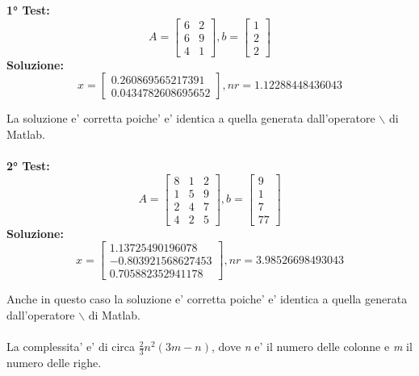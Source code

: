 \documentclass[10pt,a4paper]{article}
\begin{document}
\textbf{1° Test:}
\[
  A =
  \begin{bmatrix}
    6 & 2 \\
    6 & 9 \\
    4 & 1
  \end{bmatrix},
  b =
  \begin{bmatrix}
    1 \\ 2 \\ 2
  \end{bmatrix}
\]
\textbf{Soluzione:}
\[
  x =
  \begin{bmatrix}
    0.260869565217391 \\
    0.0434782608695652
  \end{bmatrix},
  \textit{nr} = 1.12288448436043
\]

La soluzione e' corretta poiche' e' identica a quella generata dall'operatore
$ \backslash $ di Matlab.
\\ \\
\textbf{2° Test:}
\[
  A =
  \begin{bmatrix}
    8 & 1 & 2 \\
    1 & 5 & 9 \\
    2 & 4 & 7 \\
    4 & 2 & 5
  \end{bmatrix},
  b =
  \begin{bmatrix}
    9 \\ 1 \\ 7 \\ 77
  \end{bmatrix}
\]
\textbf{Soluzione:}
\[
  x =
  \begin{bmatrix}
    1.13725490196078   \\
    -0.803921568627453 \\
    0.705882352941178
  \end{bmatrix},
  \textit{nr} = 3.98526698493043
\]

Anche in questo caso la soluzione e' corretta poiche' e' identica a quella
generata dall'operatore $ \backslash $ di Matlab.
\\
\\
La complessita' e' di circa $ \frac{2}{ 3}n^2(3m-n) $, dove \textit{n} e'
il numero delle colonne e \textit{m} il numero delle righe.

\newpage
\end{document}
